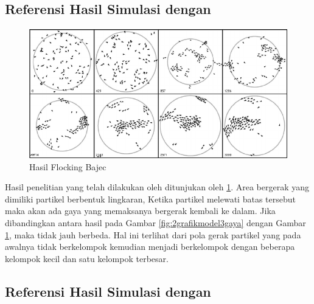 \subsection{Referensi Hasil Simulasi dengan \citep{Bajec2007}}%
\begin{figure}
\centering
\includegraphics[scale=0.4]{gambar/Bajec.PNG}
\caption{Hasil Flocking Bajec}
\label{fig:bajec1}
\end{figure}
\hspace{0.6cm}Hasil penelitian yang telah dilakukan oleh \citep{Bajec2007} ditunjukan oleh \ref{fig:bajec1}. Area bergerak yang dimiliki partikel berbentuk lingkaran, Ketika partikel melewati batas tersebut maka akan ada gaya yang memaksanya bergerak kembali ke dalam. Jika dibandingkan antara hasil pada Gambar \ref{fig:2grafikmodel3gaya}  dengan Gambar \ref{fig:bajec1}, maka tidak jauh berbeda. Hal ini terlihat dari pola gerak partikel yang pada awalnya tidak berkelompok kemudian menjadi berkelompok dengan beberapa kelompok kecil dan satu kelompok terbesar. 



%
%

\subsection{Referensi Hasil Simulasi dengan \citep{Nasir2016}}%